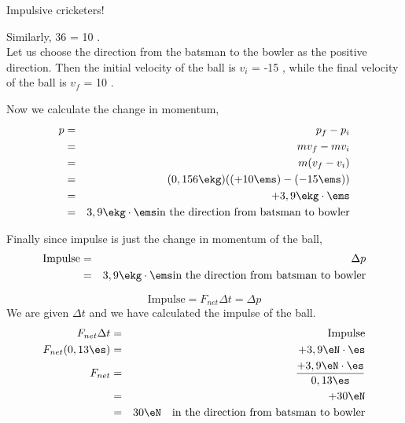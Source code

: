 \begin{wex}{Impulsive cricketers!}
{Similarly, 36 \kph = 10 \ms.\\

Let us choose the direction from the batsman to the bowler as the positive direction. Then the initial velocity of the ball is $v_i$ = -15 \ms, while the final velocity of the ball is $v_f$ = 10 \ms.

Now we calculate the change in momentum,
\begin{eqnarray*}
p &=& p_{f} - p_{i}\\
&=& mv_f - mv_i\\
&=& m(v_f - v_i)\\
&=&(0,156 \ekg)((+10 \ems)-(-15 \ems))\\
&=& +3,9 \ekg\cdot\ems\\
&=& 3,9 \ekg\cdot\ems \mbox{in the direction from batsman to bowler}
\end{eqnarray*}

Finally since impulse is just the change in momentum of the ball,
\begin{eqnarray*}
\mathrm{Impulse} &=& \Delta p\\
&=& 3,9 \ekg\cdot\ems \mbox{in the direction from batsman to bowler}
\end{eqnarray*}

\begin{equation*}
\mathrm{Impulse} = F_{net}\Delta t = \Delta p
\end{equation*}
We are given $\Delta t$ and we have calculated the impulse of the ball.
\begin{eqnarray*}
F_{net}\Delta t &=& \mathrm{Impulse}\\
F_{net}(0,13 \es) &=& +3,9 \eN\cdot\es\\
F_{net} &=& \frac{+3,9\eN\cdot\es}{0,13\es}\\
&=& +30 \eN\\
&=& 30\eN\quad \mbox{in the direction from batsman to bowler}
\end{eqnarray*}}
\end{wex}

